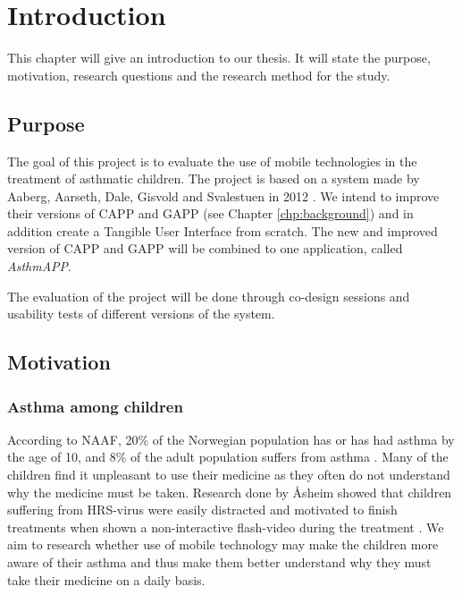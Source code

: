 \chapter{Introduction}
\label{chp:introduction}

This chapter will give an introduction to our thesis. It will state the purpose, motivation, research questions and the research method for the study. 

\section{Purpose}
\label{sec:purpose}
The goal of this project is to evaluate the use of mobile technologies in the treatment of asthmatic children. The project is based on a system made by Aaberg, Aarseth, Dale, Gisvold and Svalestuen in 2012 \cite{CustomerDriven}. We intend to improve their versions of CAPP and GAPP (see Chapter \ref{chp:background}) and in addition create a Tangible User Interface from scratch. The new and improved version of CAPP and GAPP will be combined to one application, called \emph{AsthmAPP}.

The evaluation of the project will be done through co-design sessions and usability tests of different versions of the system. 
 



\section{Motivation}
\label{sec:motivation}

\subsection{Asthma among children}
According to NAAF, 20\% of the Norwegian population has or has had asthma by the age of 10, and 8\% of the adult population suffers from asthma \cite{NAAF}. Many of the children find it unpleasant to use their medicine as they often do not understand why the medicine must be taken. Research done by \r{A}sheim showed that children suffering from HRS-virus were easily distracted and motivated to finish treatments when shown a non-interactive flash-video during the treatment \cite{Asheim610877}. We aim to research whether use of mobile technology may make the children more aware of their asthma and thus make them better understand why they must take their medicine on a daily basis. 


